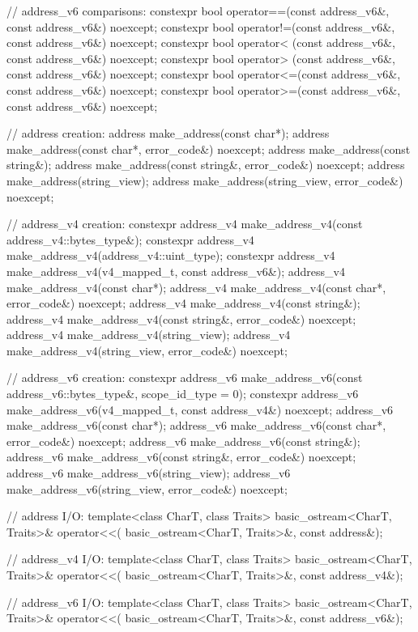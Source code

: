 \begin{codeblock}
{{{{{  // address_v6 comparisons:
  constexpr bool operator==(const address_v6&, const address_v6&) noexcept;
  constexpr bool operator!=(const address_v6&, const address_v6&) noexcept;
  constexpr bool operator< (const address_v6&, const address_v6&) noexcept;
  constexpr bool operator> (const address_v6&, const address_v6&) noexcept;
  constexpr bool operator<=(const address_v6&, const address_v6&) noexcept;
  constexpr bool operator>=(const address_v6&, const address_v6&) noexcept;

  // address creation:
  address make_address(const char*);
  address make_address(const char*, error_code&) noexcept;
  address make_address(const string&);
  address make_address(const string&, error_code&) noexcept;
  address make_address(string_view);
  address make_address(string_view, error_code&) noexcept;

  // address_v4 creation:
  constexpr address_v4 make_address_v4(const address_v4::bytes_type&);
  constexpr address_v4 make_address_v4(address_v4::uint_type);
  constexpr address_v4 make_address_v4(v4_mapped_t, const address_v6&);
  address_v4 make_address_v4(const char*);
  address_v4 make_address_v4(const char*, error_code&) noexcept;
  address_v4 make_address_v4(const string&);
  address_v4 make_address_v4(const string&, error_code&) noexcept;
  address_v4 make_address_v4(string_view);
  address_v4 make_address_v4(string_view, error_code&) noexcept;

  // address_v6 creation:
  constexpr address_v6 make_address_v6(const address_v6::bytes_type&,
                                       scope_id_type = 0);
  constexpr address_v6 make_address_v6(v4_mapped_t, const address_v4&) noexcept;
  address_v6 make_address_v6(const char*);
  address_v6 make_address_v6(const char*, error_code&) noexcept;
  address_v6 make_address_v6(const string&);
  address_v6 make_address_v6(const string&, error_code&) noexcept;
  address_v6 make_address_v6(string_view);
  address_v6 make_address_v6(string_view, error_code&) noexcept;

  // address I/O:
  template<class CharT, class Traits>
    basic_ostream<CharT, Traits>& operator<<(
      basic_ostream<CharT, Traits>&, const address&);

  // address_v4 I/O:
  template<class CharT, class Traits>
    basic_ostream<CharT, Traits>& operator<<(
      basic_ostream<CharT, Traits>&, const address_v4&);

  // address_v6 I/O:
  template<class CharT, class Traits>
    basic_ostream<CharT, Traits>& operator<<(
      basic_ostream<CharT, Traits>&, const address_v6&);

}}}}}
\end{codeblock}
